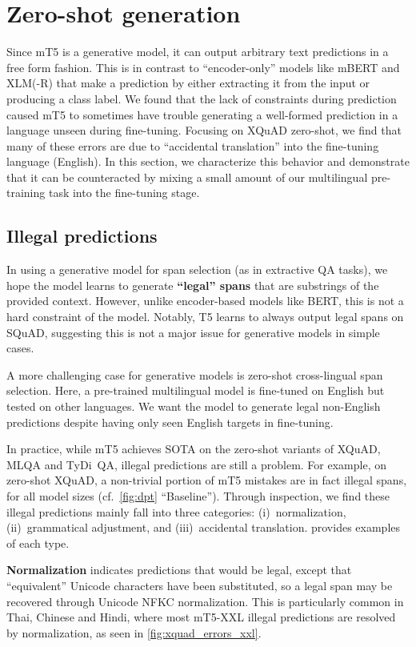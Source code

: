 \documentclass[11pt]{article}
\begin{document}
\section{Zero-shot generation}

Since mT5 is a generative model, it can output arbitrary text predictions in a free form fashion.
This is in contrast to ``encoder-only'' models like mBERT and XLM(-R) that make a prediction by either extracting it from the input or producing a class label. We found that the lack of constraints during prediction caused mT5 to sometimes have trouble generating a well-formed prediction in a language unseen during fine-tuning.
Focusing on XQuAD zero-shot, we find that many of these errors are due to ``accidental translation'' into the fine-tuning language (English).
In this section, we characterize this behavior and demonstrate that it can be counteracted by mixing a small amount of our multilingual pre-training task into the fine-tuning stage.

\subsection{Illegal predictions}

In using a generative model for span selection (as in extractive QA tasks), we hope the model learns to generate \textbf{``legal'' spans} that are substrings of the provided context.
However, unlike encoder-based models like BERT, this is not a hard constraint of the model.
Notably, T5 learns to always output legal spans on SQuAD, suggesting this is not a major issue for generative models in simple cases.

A more challenging case for generative models is zero-shot cross-lingual span selection.
Here, a pre-trained multilingual model is fine-tuned on English but tested on other languages.
We want the model to generate legal non-English predictions despite having only seen English targets in fine-tuning.

In practice, while mT5 achieves SOTA on the zero-shot variants of XQuAD, MLQA and TyDi~QA, illegal predictions are still a problem.
For example, on zero-shot XQuAD, a non-trivial portion of mT5 mistakes are in fact illegal spans, for all model sizes (cf.~\cref{fig:dpt} ``Baseline'').
Through inspection, we find these illegal predictions mainly fall into three categories: (i)~normalization, (ii)~grammatical adjustment, and (iii)~accidental translation.  provides examples of each type.

\textbf{Normalization} indicates predictions that would be legal, except that ``equivalent'' Unicode characters have been substituted, so a legal span may be recovered through Unicode NFKC normalization.
This is particularly common in Thai, Chinese and Hindi, where most mT5-XXL illegal predictions are resolved by normalization, as seen in \cref{fig:xquad_errors_xxl}.
\end{document}
